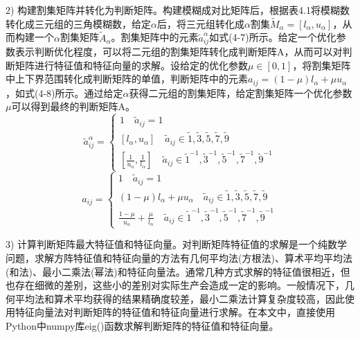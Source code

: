 2) 构建割集矩阵并转化为判断矩阵。构建模糊成对比矩阵后，根据表4.1将模糊数转化成三元组的三角模糊数，给定$\alpha$后，将三元组转化成$\alpha$割集$\widetilde{M}_{\alpha}=[l_{\alpha},u_{\alpha}]$，从而构建一个$\alpha$割集矩阵$\widetilde{A}_{\alpha}$。割集矩阵中的元素$\widetilde{a}_{ij}^{\alpha}$如式(4-7)所示。给定一个优化参数表示判断优化程度，可以将二元组的割集矩阵转化成判断矩阵A，从而可以对判断矩阵进行特征值和特征向量的求解。设给定的优化参数$\mu\in[0,1]$，将割集矩阵中上下界范围转化成判断矩阵的单值，判断矩阵中的元素$a_{ij}=(1-\mu)l_{\alpha}+\mu u_{\alpha}$，如式(4-8)所示。通过给定$\alpha$获得二元组的割集矩阵，给定割集矩阵一个优化参数$\mu$可以得到最终的判断矩阵A。
\begin{equation}
\widetilde{a}_{ij}^{\alpha} = \left\{\begin{array}{l}
1 \quad \widetilde{a}_{ij}=1 \\ [0.2cm]
[l_{\alpha},u_{\alpha}] \quad \widetilde{a}_{ij}\in{\widetilde{1},\widetilde{3},\widetilde{5},\widetilde{7},\widetilde{9}} \\ [0.2cm]
[\frac{1}{u_{\alpha}},\frac{1}{l_{\alpha}}] \quad \widetilde{a}_{ij}\in{\widetilde{1}^{-1},\widetilde{3}^{-1},\widetilde{5}^{-1},\widetilde{7}^{-1},\widetilde{9}^{-1}}
\end{array}\right.
\end{equation}
\begin{equation}
a_{ij} = \left\{\begin{array}{l}
1 \quad \widetilde{a}_{ij}=1 \\ [0.2cm]
(1-\mu)l_{\alpha}+\mu u_{\alpha} \quad \widetilde{a}_{ij}\in{\widetilde{1},\widetilde{3},\widetilde{5},\widetilde{7},\widetilde{9}} \\ [0.2cm]
\frac{1-\mu}{u_{\alpha}}+\frac{\mu}{l_{\alpha}} \quad \widetilde{a}_{ij}\in{\widetilde{1}^{-1},\widetilde{3}^{-1},\widetilde{5}^{-1},\widetilde{7}^{-1},\widetilde{9}^{-1}}
\end{array}\right.
\end{equation}

3) 计算判断矩阵最大特征值和特征向量。对判断矩阵特征值的求解是一个纯数学问题，求解方阵特征值和特征向量的方法有几何平均法(方根法)、算术平均平均法(和法)、最小二乘法(幂法)和特征向量法。通常几种方式求解的特征值很相近，但也存在细微的差别，这些小的差别对实际生产会造成一定的影响。一般情况下，几何平均法和算术平均获得的结果精确度较差，最小二乘法计算复杂度较高，因此使用特征向量法对判断矩阵的特征值和特征向量进行求解。在本文中，直接使用Python中numpy库eig()函数求解判断矩阵的特征值和特征向量。

